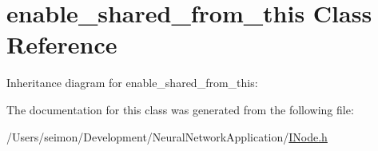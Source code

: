 \hypertarget{classboost_1_1enable__shared__from__this}{
\section{enable\_\-shared\_\-from\_\-this Class Reference}
\label{classboost_1_1enable__shared__from__this}
}


Inheritance diagram for enable\_\-shared\_\-from\_\-this:


The documentation for this class was generated from the following file:\begin{DoxyCompactItemize}
\item 
/Users/seimon/Development/NeuralNetworkApplication/\hyperlink{_i_node_8h}{INode.h}\end{DoxyCompactItemize}
